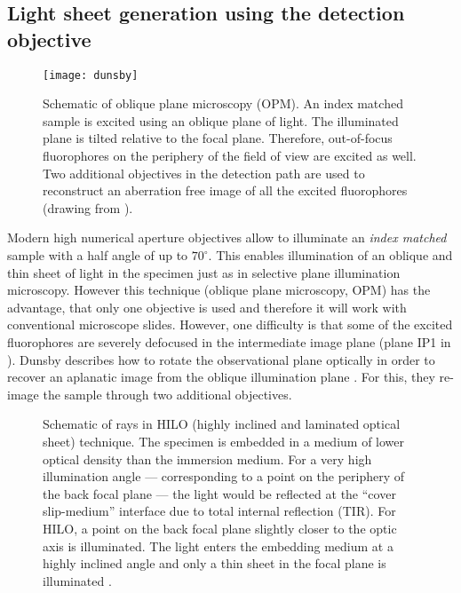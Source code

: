 \subsection{Light sheet generation using the detection objective}
\label{sec:hilo}
\begin{figure}[!hbt]
  \centering
  \texttt{[image: dunsby]}
  \caption{Schematic of oblique plane microscopy (OPM). An index
    matched sample is excited using an oblique plane of light. The
    illuminated plane is tilted relative to the focal
    plane. Therefore, out-of-focus fluorophores on the periphery of
    the field of view are excited as well. Two additional objectives
    in the detection path are used to reconstruct an aberration free
    image of all the excited fluorophores (drawing from
    \cite{Dunsby2008}).}
  \label{fig:dunsby}
\end{figure}
Modern high numerical aperture objectives allow to illuminate an
\emph{index matched} sample with a half angle of up to
$70^\circ$. This enables illumination of an oblique and thin sheet of
light in the specimen just as in selective plane illumination
microscopy. However this technique (oblique plane microscopy, OPM) has
the advantage, that only one objective is used and therefore it will
work with conventional microscope slides. However, one difficulty is
that some of the excited fluorophores are severely defocused in the
intermediate image plane (plane IP1 in ). Dunsby
describes how to rotate the observational plane optically in order to
recover an aplanatic image from the oblique illumination plane
\citep{Dunsby2008}. For this, they re-image the sample through two
additional objectives.


\begin{figure}[!hbt]
  \centering
  \caption{Schematic of rays in HILO (highly inclined and laminated
    optical sheet) technique. The specimen is embedded in a medium of
    lower optical density than the immersion medium. For a very high
    illumination angle --- corresponding to a point on the periphery
    of the back focal plane --- the light would be reflected at the
    ``cover slip-medium'' interface due to total internal reflection
    (TIR). For HILO, a point on the back focal plane slightly closer
    to the optic axis is illuminated. The light enters the embedding
    medium at a highly inclined angle and only a thin sheet in the
    focal plane is illuminated \citep[inspired from][]{Tokunaga2008}.}
  \label{fig:hilo}
\end{figure}


